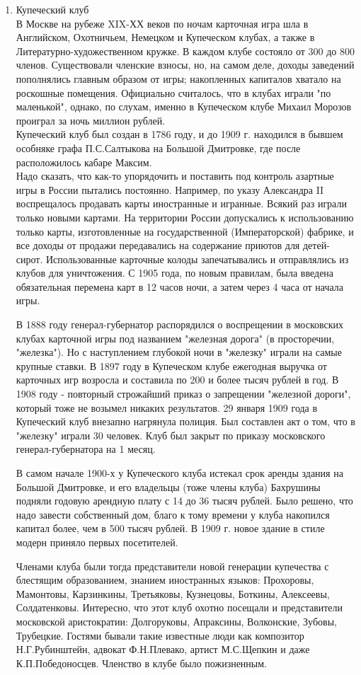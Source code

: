 \documentclass[a4paper,12pt]{article}
\begin{document}
\begin{enumerate}
\item{Купеческий клуб}\\
В Москве на рубеже XIX-ХХ веков по ночам карточная игра шла в  Английском, Охотничьем, Немецком и Купеческом клубах, а также в Литературно-художественном кружке. В каждом клубе состояло от 300 до 800 членов. Существовали членские взносы, но, на самом деле, доходы заведений пополнялись главным образом от игры; накопленных капиталов хватало на роскошные помещения. Официально считалось, что в клубах играли "по маленькой", однако, по слухам, именно в Купеческом клубе Михаил Морозов проиграл за ночь миллион рублей.\\
Купеческий клуб был создан в 1786 году, и до 1909 г. находился в бывшем особняке графа П.С.Салтыкова на Большой Дмитровке, где после расположилось кабаре Максим.\\
Надо сказать, что как-то упорядочить и поставить под контроль азартные игры в России пытались постоянно. Например, по указу Александра II воспрещалось продавать карты иностранные и игранные. Всякий раз играли только новыми картами. На территории России допускались к использованию только карты, изготовленные на государственной (Императорской) фабрике, и все доходы от продажи передавались на содержание приютов для детей-сирот. Использованные карточные колоды запечатывались и отправлялись из клубов для уничтожения. С 1905 года, по новым правилам, была введена обязательная перемена карт в 12 часов ночи, а затем через 4 часа от начала игры.

В 1888 году генерал-губернатор распорядился о воспрещении в московских клубах карточной игры под названием "железная дорога" (в просторечии, "железка"). Но с наступлением глубокой ночи в "железку" играли на самые крупные ставки. В 1897 году в Купеческом клубе ежегодная выручка от карточных игр возросла и составила по 200 и более тысяч рублей в год. В 1908 году - повторный строжайший приказ о запрещении "железной дороги", который тоже не возымел никаких результатов. 29 января 1909 года в Купеческий клуб внезапно нагрянула полиция. Был составлен акт о том, что в "железку" играли 30 человек. Клуб был закрыт по приказу московского генерал-губернатора на 1 месяц.

В самом начале 1900-х у Купеческого клуба истекал срок аренды здания на Большой Дмитровке, и его владельцы (тоже члены клуба) Бахрушины подняли годовую арендную плату с 14 до 36 тысяч рублей. Было решено, что надо завести собственный дом, благо к тому времени у клуба накопился капитал более, чем в 500 тысяч рублей. В 1909 г. новое здание в стиле модерн приняло первых посетителей. 

Членами клуба были тогда представители новой генерации купечества с блестящим образованием, знанием иностранных языков: Прохоровы, Мамонтовы, Карзинкины, Третьяковы, Кузнецовы, Боткины, Алексеевы, Солдатенковы. Интересно, что этот клуб охотно посещали и представители московской аристократии: Долгоруковы, Апраксины, Волконские, Зубовы, Трубецкие. Гостями бывали такие известные люди как композитор Н.Г.Рубинштейн, адвокат Ф.Н.Плевако, артист М.С.Щепкин и даже К.П.По\-бе\-до\-нос\-цев. Членство в клубе было пожизненным.



\end{enumerate}
\end{document}
